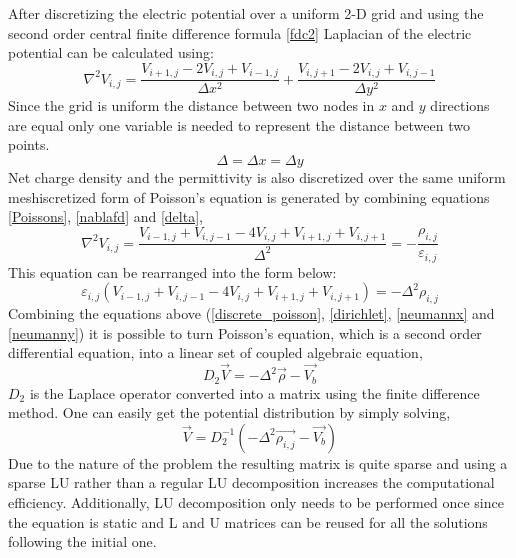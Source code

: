 \begin{doublespace}
After discretizing the electric potential over a uniform 2-D grid and using the second order central finite difference formula \eqref{fdc2}  Laplacian of the electric potential can be calculated using\cite{NumModel}:
\begin{equation}
 \nabla^2 V_{i,j}=\frac{V_{i+1,j}-2V_{i,j}+V_{i-1,j}}{\Delta x^2}+\frac{V_{i,j+1}-2V_{i,j}+V_{i,j-1}}{\Delta y^2}
 \label{nablafd}
\end{equation}
Since the grid is uniform the distance between two nodes in $x$ and $y$ directions are equal  only one variable is needed to represent the distance between two points.
\begin{equation}
\Delta=\Delta x =\Delta y
\label{delta}
\end{equation}
Net charge density and the permittivity is also discretized over the same uniform meshiscretized form of Poisson's equation is generated by combining equations \ref{Poissons}, \ref{nablafd} and \ref{delta},
\begin{equation}
 \nabla^2 V_{i,j}=\frac{V_{i-1,j}+V_{i,j-1}-4V_{i,j}+V_{i+1,j}+V_{i,j+1}}{\Delta^2}=-\frac{\rho_{i,j}}{\varepsilon_{i,j}}
\end{equation}
This equation can be rearranged into the form below:
\begin{equation}
\varepsilon_{i,j}(V_{i-1,j}+V_{i,j-1}-4V_{i,j}+V_{i+1,j}+V_{i,j+1})=-\Delta^2\rho_{i,j}
\label{discrete_poisson}
\end{equation}
Combining the equations above (\ref{discrete_poisson}, \ref{dirichlet}, \ref{neumannx} and \ref{neumanny}) it is possible to turn Poisson's equation, which is a second order differential equation, into a linear set of coupled algebraic equation,
\begin{equation}
D_{2}\vec{V}=-\Delta^2\vec{\rho}-\vec{V_b}
\end{equation}
 $D_{2}$ is the Laplace operator converted into a matrix using the finite difference method. One can easily get the potential distribution by simply solving,  
\begin{equation}
\vec{V}=D_{2}^{-1}(-\Delta^2\vec{\rho_{i,j}}-\vec{V_b})
\label{poimatrix}
\end{equation}
Due to the nature of the problem the resulting matrix  is quite sparse and using a sparse LU rather than a regular LU decomposition increases the computational efficiency. Additionally,  LU decomposition only needs to be performed once since the equation is static and  L and U matrices can be reused for all the solutions following the initial one. 


\end{doublespace}
